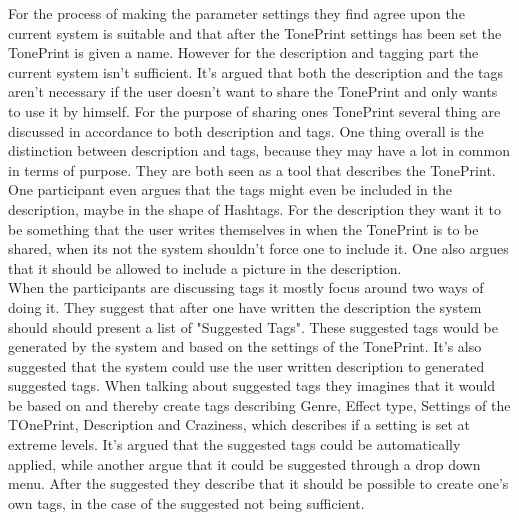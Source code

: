 \noindent
For the process of making the parameter settings they find agree upon the current system is suitable and that after the TonePrint settings has been set the TonePrint is given a name. However for the description and tagging part the current system isn't sufficient. It's argued that both the description and the tags aren't necessary if the user doesn't want to share the TonePrint and only wants to use it  by himself. For the purpose of sharing ones TonePrint several thing are discussed in accordance to both description and tags. One thing overall is the distinction between description and tags, because they may have a lot in common in terms of purpose. They are both seen as a tool that describes the TonePrint. One participant even argues that the tags might even be included in the description, maybe in the shape of Hashtags. For the description they want it to be something that the user writes themselves in when the TonePrint is to be shared, when its not the system shouldn't force one to include it. One also argues that it should be allowed to include a picture in the description. \\
When the participants are discussing tags it mostly focus around two ways of doing it. They suggest that after one have written the description the system should should present a list of "Suggested Tags". These suggested tags would be generated by the system and based on the settings of the TonePrint. It's also suggested that the system could use the user written description to generated suggested tags. When talking about suggested tags they imagines that it would be based on and thereby create tags describing Genre, Effect type, Settings of the TOnePrint, Description and Craziness, which describes if a setting is set at extreme levels. It's argued that the suggested tags could be automatically applied, while another argue that it could be suggested through a drop down menu. After the suggested they describe that it should be possible to create one's own tags, in the case of the suggested not being sufficient. \\
